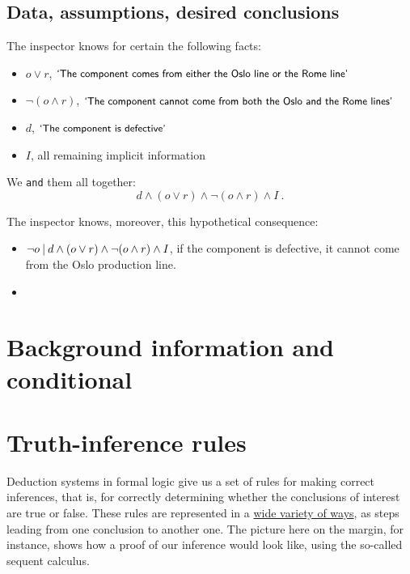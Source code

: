 \documentclass[
  a4paper,
  DIV=11,
  numbers=noendperiod,
  oneside]{scrreprt}
\begin{document}
\hypertarget{data-assumptions-desired-conclusions}{%
\subsection{Data, assumptions, desired
conclusions}\label{data-assumptions-desired-conclusions}}

The inspector knows for certain the following facts:

\begin{itemize}
\item
  \(o \lor r\),
  \(\textsf{\small`The component comes from either the Oslo line or the Rome line'}\)
\item
  \(\lnot(o \land r)\),
  \(\textsf{\small`The component cannot come from both the Oslo and the Rome lines'}\)
\item
  \(d\), \(\textsf{\small`The component is defective'}\)
\item
  \(I\), all remaining implicit information
\end{itemize}

We \texttt{and} them all together: \[
d \land (o \lor r) \land \lnot (o \land r) \land I \ .
\]

The inspector knows, moreover, this hypothetical consequence:

\begin{itemize}
\item
  \(\lnot o \nonscript\:\vert\nonscript\:\mathopen{} d \land (o \lor r) \land \lnot (o \land r) \land I\),
  if the component is defective, it cannot come from the Oslo production
  line.
\item
\end{itemize}

\hypertarget{background-information-and-conditional}{%
\section{Background information and
conditional}\label{background-information-and-conditional}}

\hfill\break

\hypertarget{truth-inference-rules}{%
\section{Truth-inference rules}\label{truth-inference-rules}}

Deduction systems in formal logic give us a set of rules for making
correct inferences, that is, for correctly determining whether the
conclusions of interest are true or false. These rules are represented
in a
\href{https://plato.stanford.edu/archives/spr2023/entries/natural-deduction}{wide
variety of ways}, as steps leading from one conclusion to another one.
The picture here on the margin, for instance, shows how a proof of our
inference would look like, using the so-called sequent calculus.
\end{document}
